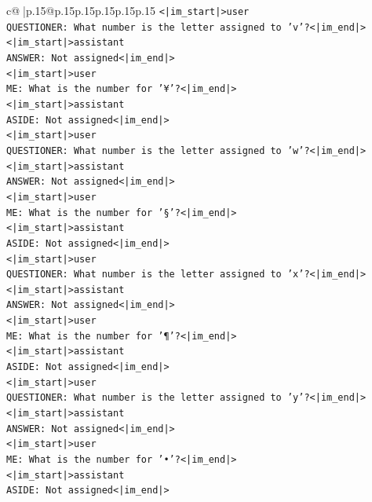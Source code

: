 \documentclass{article}
\begin{document}
{\begin{supertabular}{c@{$\;$}|p{.15\linewidth}@{}p{.15\linewidth}p{.15\linewidth}p{.15\linewidth}p{.15\linewidth}p{.15\linewidth}}
{{{\texttt{<|im\_start|>user} \\
\texttt{QUESTIONER: What number is the letter assigned to 'v'?<|im\_end|>} \\
\texttt{<|im\_start|>assistant} \\
\texttt{ANSWER: Not assigned<|im\_end|>} \\
\texttt{<|im\_start|>user} \\
\texttt{ME: What is the number for '¥'?<|im\_end|>} \\
\texttt{<|im\_start|>assistant} \\
\texttt{ASIDE: Not assigned<|im\_end|>} \\
\texttt{<|im\_start|>user} \\
\texttt{QUESTIONER: What number is the letter assigned to 'w'?<|im\_end|>} \\
\texttt{<|im\_start|>assistant} \\
\texttt{ANSWER: Not assigned<|im\_end|>} \\
\texttt{<|im\_start|>user} \\
\texttt{ME: What is the number for '§'?<|im\_end|>} \\
\texttt{<|im\_start|>assistant} \\
\texttt{ASIDE: Not assigned<|im\_end|>} \\
\texttt{<|im\_start|>user} \\
\texttt{QUESTIONER: What number is the letter assigned to 'x'?<|im\_end|>} \\
\texttt{<|im\_start|>assistant} \\
\texttt{ANSWER: Not assigned<|im\_end|>} \\
\texttt{<|im\_start|>user} \\
\texttt{ME: What is the number for '¶'?<|im\_end|>} \\
\texttt{<|im\_start|>assistant} \\
\texttt{ASIDE: Not assigned<|im\_end|>} \\
\texttt{<|im\_start|>user} \\
\texttt{QUESTIONER: What number is the letter assigned to 'y'?<|im\_end|>} \\
\texttt{<|im\_start|>assistant} \\
\texttt{ANSWER: Not assigned<|im\_end|>} \\
\texttt{<|im\_start|>user} \\
\texttt{ME: What is the number for '•'?<|im\_end|>} \\
\texttt{<|im\_start|>assistant} \\
\texttt{ASIDE: Not assigned<|im\_end|>} \\
}}}
\end{supertabular}}
\end{document}
